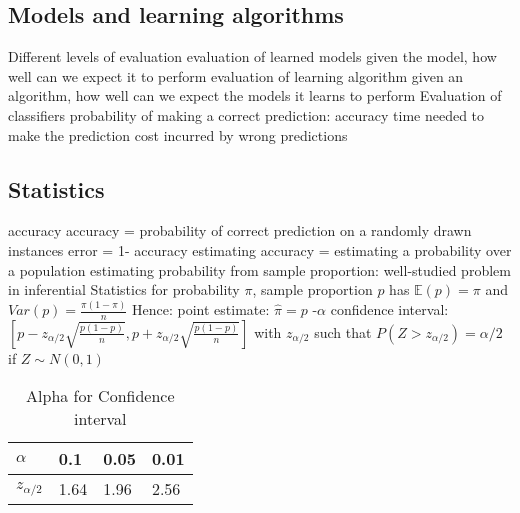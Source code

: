 \subsection{Models and learning algorithms}
\begin{outline}
    \1 Different levels of evaluation
        \2 evaluation of learned models
            \3 given the model, how well can we expect it to perform
        \2 evaluation of learning algorithm
            \3 given an algorithm, how well can we expect the models it learns to perform
    \1 Evaluation of classifiers
        \2 probability of making a correct prediction: accuracy
        \2 time needed to make the prediction
        \2 cost incurred by wrong predictions
\end{outline}

\subsection{Statistics}
\begin{outline}
    \1 accuracy
        \2 accuracy = probability of correct prediction on a randomly drawn instances
        \2 error = 1- accuracy
        \2 estimating accuracy = estimating a probability over a population
        \2 estimating probability from sample proportion: well-studied problem in inferential Statistics
        \2 for probability $\pi$, sample proportion $p$ has $\mathbb{E}(p)=\pi$ and $Var(p)=\frac{\pi(1 - \pi)}{n}$
        \2 Hence:
            \3 point estimate: $\hat{\pi} = p$
            -$\alpha$ confidence interval: $[p - z_{\alpha/2} \sqrt{\frac{p(1-p)}{n}}, p + z_{\alpha/2} \sqrt{\frac{p(1-p)}{n}}]$ with $z_{\alpha/2}$ such that $P(Z > z_{\alpha/2}) = \alpha/2$ if $Z \sim N(0,1)$
\end{outline}

\begin{table}[htbp]\footnotesize
    \centering
    \caption{Alpha for Confidence interval}
    \begin{tabularx}{\textwidth}{X|X|X|X}
    \toprule
    \textbf{$\alpha$}&\textbf{0.1}&\textbf{0.05}&\textbf{0.01} \\
    \hline
    \textbf{$z_{\alpha/2}$}&1.64&1.96&2.56 \\
    \bottomrule
    \end{tabularx}
    \label{tab:diff_classification_association_rules}
\end{table}

